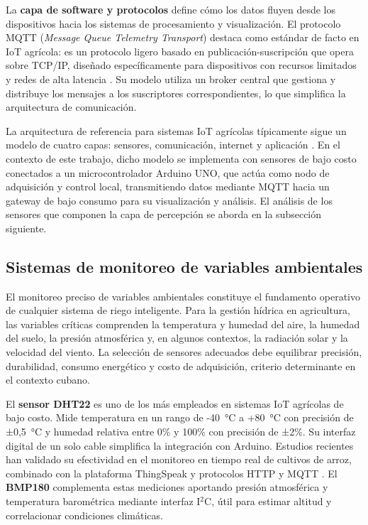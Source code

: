 La \textbf{capa de software y protocolos} define cómo los datos fluyen desde los dispositivos hacia los sistemas de procesamiento y visualización. El protocolo MQTT (\emph{Message Queue Telemetry Transport}) destaca como estándar de facto en IoT agrícola: es un protocolo ligero basado en publicación-suscripción que opera sobre TCP/IP, diseñado específicamente para dispositivos con recursos limitados y redes de alta latencia \citep{tian2024novel}. Su modelo utiliza un broker central que gestiona y distribuye los mensajes a los suscriptores correspondientes, lo que simplifica la arquitectura de comunicación.

La arquitectura de referencia para sistemas IoT agrícolas típicamente sigue un modelo de cuatro capas: sensores, comunicación, internet y aplicación \citep{shahroorei2024smart}. En el contexto de este trabajo, dicho modelo se implementa con sensores de bajo costo conectados a un microcontrolador Arduino UNO, que actúa como nodo de adquisición y control local, transmitiendo datos mediante MQTT hacia un gateway de bajo consumo para su visualización y análisis. El análisis de los sensores que componen la capa de percepción se aborda en la subsección siguiente.

\subsection{Sistemas de monitoreo de variables ambientales}\label{subsec:monitoreo}

El monitoreo preciso de variables ambientales constituye el fundamento operativo de cualquier sistema de riego inteligente. Para la gestión hídrica en agricultura, las variables críticas comprenden la temperatura y humedad del aire, la humedad del suelo, la presión atmosférica y, en algunos contextos, la radiación solar y la velocidad del viento. La selección de sensores adecuados debe equilibrar precisión, durabilidad, consumo energético y costo de adquisición, criterio determinante en el contexto cubano.

El \textbf{sensor DHT22} es uno de los más empleados en sistemas IoT agrícolas de bajo costo. Mide temperatura en un rango de -40~°C a +80~°C con precisión de ±0,5~°C y humedad relativa entre 0\% y 100\% con precisión de ±2\%. Su interfaz digital de un solo cable simplifica la integración con Arduino. Estudios recientes han validado su efectividad en el monitoreo en tiempo real de cultivos de arroz, combinado con la plataforma ThingSpeak y protocolos HTTP y MQTT \citep{lozano2024desarrollo}. El \textbf{BMP180} complementa estas mediciones aportando presión atmosférica y temperatura barométrica mediante interfaz I$^2$C, útil para estimar altitud y correlacionar condiciones climáticas.

